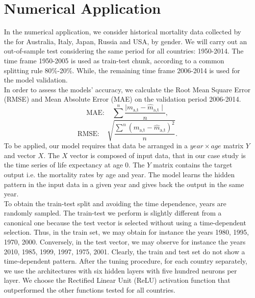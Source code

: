 \documentclass[a4,11pt]{article}
\begin{document}

\section{Numerical Application}
In the numerical application, we consider historical mortality data collected by the \cite{HM} for Australia, Italy, Japan, Russia and USA, by gender.
We will carry out an out-of-sample test considering the same period for all countries: 1950-2014. The time frame 1950-2005 is used as train-test chunk, according to a common splitting rule 80\%-20\%. 
While, the remaining time frame 2006-2014 is used for the model validation.\\
In order to assess the models’ accuracy, we calculate the Root Mean Square Error (RMSE) and Mean Absolute Error (MAE) on the validation period 2006-2014.
\begin{equation}
	\text{MAE}: \quad \sum^{n} \frac{\mid m_{\text{a,t}} - \hat{m}_{\text{a,t}} \mid}{n},
	\end{equation}
	\begin{equation}
	\text{RMSE}: \quad \sqrt{\frac{\sum^{n} (m_{\text{a,t}} - \hat{m}_{\text{a,t}})^2}{n }}. 
\end{equation}
To be applied, our model requires that data be arranged in a $year \times age$ matrix $Y$ and vector $X$.
The $X$ vector is composed of input data, that in our case study is the time series of life expectancy at age 0. The $Y$ matrix contains the target output i.e. the mortality rates by age and year. 
The model learns the hidden pattern in the input data in a given year and gives back the output in the same year.  \\
To obtain the train-test split and avoiding the time dependence, years are randomly sampled.		
The train-test we perform is slightly different from a canonical one because the test vector is selected without using a time-dependent selection. 
Thus, in the train set, we may obtain for instance the years 1980, 1995, 1970, 2000. Conversely, in the test vector, we may observe for instance the years 2010, 1985, 1999, 1997, 1975, 2001. Clearly, the train and test set do not show a time-dependent pattern.
After the tuning procedure, for each country separately, we use the architectures with six hidden layers with five hundred neurons per layer.
We choose the Rectified Linear Unit (ReLU) activation function%
 that outperformed the other functions tested for all countries. 
	
\end{document}
